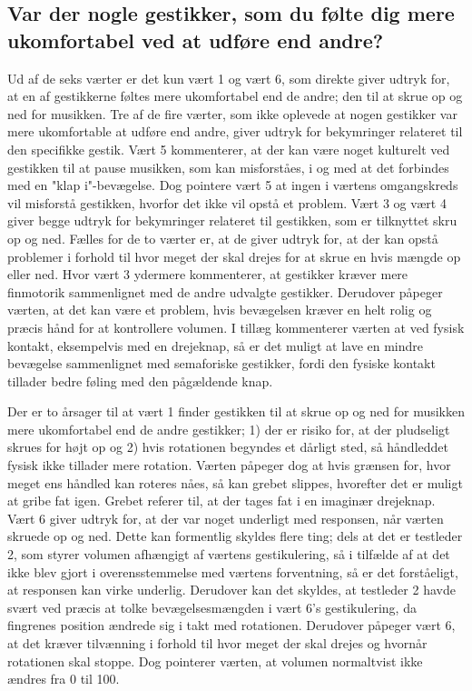 \subsection{Var der nogle gestikker, som du følte dig mere ukomfortabel ved at udføre end andre?}
\label{TestresultaterSocialAcceptGestikkerUkomfortabelt}
%
Ud af de seks værter er det kun vært 1 og vært 6, som direkte giver udtryk for, at en af gestikkerne føltes mere ukomfortabel end de andre; den til at skrue op og ned for musikken. Tre af de fire værter, som ikke oplevede at nogen gestikker var mere ukomfortable at udføre end andre, giver udtryk for bekymringer relateret til den specifikke gestik. Vært 5 kommenterer, at der kan være noget kulturelt ved gestikken til at pause musikken, som kan misforståes, i og med at det forbindes med en "klap i"-bevægelse. Dog pointere vært 5 at ingen i værtens omgangskreds vil misforstå gestikken, hvorfor det ikke vil opstå et problem. Vært 3 og vært 4 giver begge udtryk for bekymringer relateret til gestikken, som er tilknyttet skru op og ned. Fælles for de to værter er, at de giver udtryk for, at der kan opstå problemer i forhold til hvor meget der skal drejes for at skrue en hvis mængde op eller ned. Hvor vært 3 ydermere kommenterer, at gestikker kræver mere finmotorik sammenlignet med de andre udvalgte gestikker. Derudover påpeger værten, at det kan være et problem, hvis bevægelsen kræver en helt rolig og præcis hånd for at kontrollere volumen. I tillæg kommenterer værten at ved fysisk kontakt, eksempelvis med en drejeknap, så er det muligt at lave en mindre bevægelse sammenlignet med semaforiske gestikker, fordi den fysiske kontakt tillader bedre føling med den pågældende knap. 

Der er to årsager til at vært 1 finder gestikken til at skrue op og ned for musikken mere ukomfortabel end de andre gestikker; 1) der er risiko for, at der pludseligt skrues for højt op og 2) hvis rotationen begyndes et dårligt sted, så håndleddet fysisk ikke tillader mere rotation. Værten påpeger dog at hvis grænsen for, hvor meget ens håndled kan roteres nåes, så kan grebet slippes, hvorefter det er muligt at gribe fat igen. Grebet referer til, at der tages fat i en imaginær drejeknap. Vært 6 giver udtryk for, at der var noget underligt med responsen, når værten skruede op og ned. Dette kan formentlig skyldes flere ting; dels at det er testleder 2, som styrer volumen afhængigt af værtens gestikulering, så i tilfælde af at det ikke blev gjort i overensstemmelse med værtens forventning, så er det forståeligt, at responsen kan virke underlig. Derudover kan det skyldes, at testleder 2 havde svært ved præcis at tolke bevægelsesmængden i vært 6's gestikulering, da fingrenes position ændrede sig i takt med rotationen. Derudover påpeger vært 6, at det kræver tilvænning i forhold til hvor meget der skal drejes og hvornår rotationen skal stoppe. Dog pointerer værten, at volumen normaltvist ikke ændres fra 0 til 100. 
%

